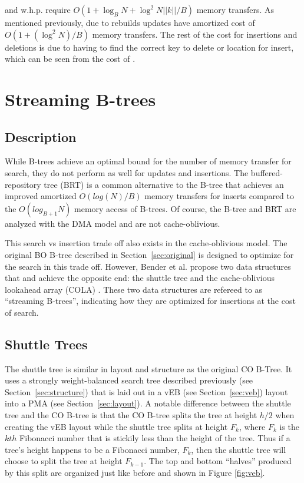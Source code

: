 \documentclass{style}
\begin{document}
\Insertkonly{} and \Delete{} w.h.p. require $O(1+\log_{B}N+\log^{2}N||k||/B)$ memory transfers. As mentioned previously, due to rebuilds updates have amortized cost of $O(1+(\log^{2}N)/B)$ memory transfers. The rest of the cost for insertions and deletions is due to having to find the correct key to delete or location for insert, which can be seen from the cost of \Search{}.

\section{Streaming B-trees}

\subsection{Description}

While B-trees achieve an optimal bound for the number of memory transfer for
search, they do not perform as well for updates and insertions. The
buffered-repository tree (BRT) is a common alternative to the B-tree that
achieves an improved amortized $O(log(N)/B)$ memory transfers for inserts
compared to the $O(log_{B+1}N)$ memory access of B-trees. Of course, the
B-tree and BRT are analyzed with the DMA model and are not cache-oblivious.

This search vs insertion trade off also exists in the cache-oblivious model.
The original BO B-tree described in Section~\ref{sec:original} is designed to
optimize for the search in this trade off. However, Bender et al. propose two
data structures that and achieve the opposite end: the shuttle tree and the
cache-oblivious lookahead array (COLA) \cite{BenderFaFi07}. These two data
structures are refereed to as ``streaming B-trees'', indicating how they are
optimized for insertions at the cost of search.

\subsection{Shuttle Trees}

The shuttle tree is similar in layout and structure as the original CO B-Tree.
It uses a strongly weight-balanced search tree described previously (see
Section~\ref{sec:structure}) that is laid out in a vEB (see
Section~\ref{sec:veb}) layout into a PMA (see Section~\ref{sec:layout}). A
notable difference between the shuttle tree and the CO B-tree is that the CO
B-tree splits the tree at height $h/2$ when creating the vEB layout while the
shuttle tree splits at height $F_k$, where $F_k$ is the $kth$ Fibonacci number
that is stickily less than the height of the tree. Thus if a tree's height
happens to be a Fibonacci number, $F_k$, then the shuttle tree will choose to
split the tree at height $F_{k-1}$. The top and bottom ``halves'' produced by
this split are organized just like before and shown in Figure \ref{fig:veb}.
\end{document}
